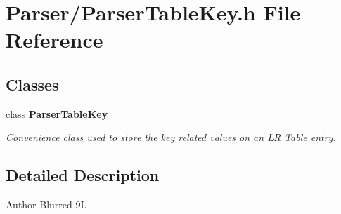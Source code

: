 \section{Parser/\-Parser\-Table\-Key.h File Reference}
\label{_parser_table_key_8h}
\subsection*{Classes}
\begin{DoxyCompactItemize}
\item 
class {\bf Parser\-Table\-Key}
\begin{DoxyCompactList}\small\item\em Convenience class used to store the key related values on an L\-R Table entry. \end{DoxyCompactList}\end{DoxyCompactItemize}


\subsection{Detailed Description}
\begin{DoxyAuthor}{Author}
Blurred-\/9\-L 
\end{DoxyAuthor}
